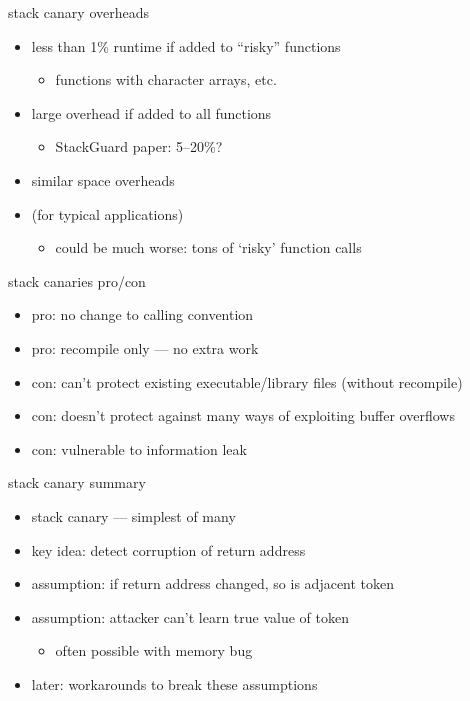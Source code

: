 \begin{frame}{stack canary overheads}
    \begin{itemize}
    \item less than 1\% runtime if added to ``risky'' functions
        \begin{itemize}
        \item functions with character arrays, etc.
        \end{itemize}
    \item large overhead if added to all functions
        \begin{itemize}
        \item StackGuard paper: 5--20\%?
        \end{itemize}
    \item similar space overheads
    \vspace{.5cm}
    \item (for typical applications)
        \begin{itemize}
        \item could be much worse: tons of `risky' function calls
        \end{itemize}
    \end{itemize}
\end{frame}

\begin{frame}{stack canaries pro/con}
    \begin{itemize}
        \item pro: no change to calling convention
        \item pro: recompile only --- no extra work
        \item con: can't protect existing executable/library files (without recompile)
        \item con: doesn't protect against many ways of exploiting buffer overflows
        \item con: vulnerable to information leak
    \end{itemize}
\end{frame}

\begin{frame}{stack canary summary}
    \begin{itemize}
    \item stack canary --- simplest of many 
    \item key idea: detect corruption of return address
    \item assumption: if return address changed, so is adjacent token
    \item assumption: attacker can't learn true value of token
        \begin{itemize}
        \item often possible with memory bug
        \end{itemize}
    \vspace{.5cm}
    \item later: workarounds to break these assumptions
    \end{itemize}
\end{frame}

